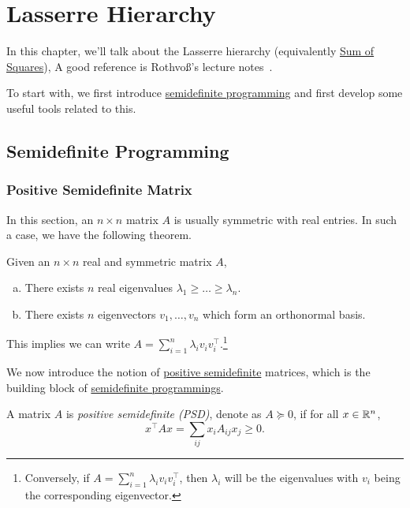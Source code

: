 \chapter{Lasserre Hierarchy}

In this chapter, we'll talk about the Lasserre hierarchy (equivalently \href{https://en.wikipedia.org/wiki/Sum-of-squares_optimization}{Sum of Squares}), A good reference is Rothvoß's lecture notes~\cite{LasserreHierarchy}.

To start with, we first introduce \hyperref[def:SDP]{semidefinite programming} and first develop some useful tools related to this.

\section{Semidefinite Programming}
\subsection{Positive Semidefinite Matrix}
In this section, an \(n\times n\) matrix \(A\) is usually symmetric with real entries. In such a case, we have the following theorem.

\begin{prev}
	Given an \(n\times n\) real and symmetric matrix \(A\),
	\begin{enumerate}[(a)]
		\item There exists \(n\) real eigenvalues \(\lambda _1 \geq \ldots \geq \lambda _n \).
		\item There exists \(n\) eigenvectors \(v_1, \ldots  , v_n\) which form an orthonormal basis.
	\end{enumerate}
	This implies we can write \(A = \sum_{i=1}^n \lambda _i v_i v_i ^{\top}\).\footnote{Conversely, if \(A= \sum_{i=1}^n \lambda _i v_i v_i ^{\top}  \), then \(\lambda _i\) will be the eigenvalues with \(v_i\) being the corresponding eigenvector.}
\end{prev}

We now introduce the notion of \hyperref[def:PSD]{positive semidefinite} matrices, which is the building block of \hyperref[def:SDP]{semidefinite programmings}.

\begin{definition}\label{def:PSD}
	A matrix \(A\) is \emph{positive semidefinite (PSD)}, denote as \(A \succeq 0\), if for all \(x\in \mathbb{\MakeUppercase{r}} ^n\),
	\[
		x^{\top} A x = \sum_{ij} x_i A_{ij} x_j \geq 0.
	\]
\end{definition}

